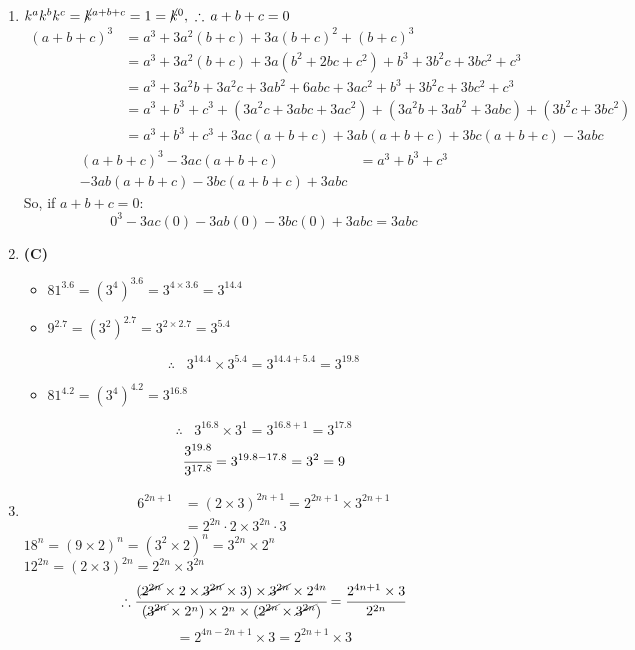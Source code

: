 \begin{multicols}{2}
\begin{enumerate}[label={\arabic*.}]
    \item \( k^a k^b k^c = \cancel{k}^{a + b + c} = 1 = \cancel{k}^0, \,\, \therefore \, a + b + c = 0 \)
    \begin{align*} 
        (a + b + c)^3 &= a^3 + 3a^2(b + c) + 3a(b + c)^2 + (b + c)^3 \\
        &= a^3 + 3a^2(b + c) + 3a(b^2 + 2bc + c^2) + b^3 + 3b^2c + 3bc^2 + c^3 \\
        &= a^3 + 3a^2b + 3a^2c + 3ab^2 + 6abc + 3ac^2 + b^3 + 3b^2c + 3bc^2 + c^3 \\
        &= a^3 + b^3 + c^3 + (3a^2c + 3abc + 3ac^2) + (3a^2b + 3ab^2 + 3abc) + (3b^2c + 3bc^2) \\
        &= a^3 + b^3 + c^3 + 3ac(a + b + c) + 3ab(a + b + c) + 3bc(a + b + c) - 3abc
    \end{align*}
    \vspace{-20pt}
    \begin{align*}
    (a + b + c)^3 - 3ac(a + b + c) &= a^3 + b^3 + c^3 \\
    - 3ab(a + b + c) - 3bc(a + b + c) + 3abc
    \end{align*}
    So, if \( a + b + c = 0 \):
    \[0^3 - 3ac(0) - 3ab(0) - 3bc(0) + 3abc = 3abc\]

    \item \textbf{(C)}
        \begin{itemize} 
        \item \( 81^{3.6} = (3^4)^{3.6} = 3^{4 \times 3.6} = 3^{14.4} \)
        \item \( 9^{2.7} = (3^2)^{2.7} = 3^{2 \times 2.7} = 3^{5.4} \)
        \end{itemize}
        \[\therefore \hspace{10pt} 3^{14.4} \times 3^{5.4} = 3^{14.4 + 5.4} = 3^{19.8}\]
        \begin{itemize} 
        \item \( 81^{4.2} = (3^4)^{4.2} = 3^{16.8} \)
        \end{itemize}
        \[\therefore \hspace{10pt} 3^{16.8} \times 3^{1} = 3^{16.8 + 1} = 3^{17.8}\]
        \[\cfrac{3^{19.8}}{3^{17.8}} = 3^{19.8 - 17.8} = 3^2 = 9\]

    \item
        \begin{align*}
        6^{2n + 1} &= (2 \times 3)^{2n + 1} = 2^{2n + 1} \times 3^{2n + 1} \\
            &= 2^{2n} \cdot 2 \times 3^{2n} \cdot 3
        \end{align*}
        \( 18^n = (9 \times 2)^n = (3^2 \times 2)^n = 3^{2n} \times 2^n \) \\
        \( 12^{2n} = (2 \times 3)^{2n} = 2^{2n} \times 3^{2n} \)
        \[\therefore \cfrac{(\cancel{2^{2n}} \times 2 \times \cancel{3^{2n}} \times 3) \times \cancel{3^{2n}} \times 2^{4n}}{(\cancel{3^{2n}} \times 2^n) \times 2^n \times (\cancel{2^{2n}} \times \cancel{3^{2n}})} = \cfrac{2^{4n + 1} \times 3}{2^{2n}}\]
        \[= 2^{4n - 2n + 1} \times 3 = 2^{2n + 1} \times 3\]


\end{enumerate}
\end{multicols}
